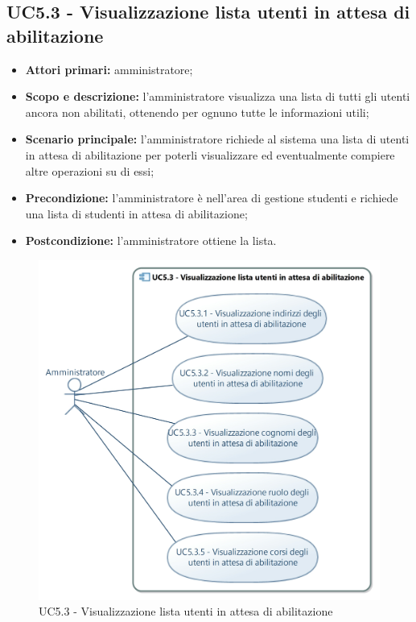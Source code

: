 \documentclass[AnalisiDeiRequisiti.tex]{subfiles}
\begin{document}
\subsection{UC5.3 - Visualizzazione lista utenti in attesa di abilitazione}
\begin{itemize}
	\item \textbf{Attori primari:} amministratore;
	\item \textbf{Scopo e descrizione:} l'amministratore visualizza una lista di tutti gli utenti ancora non abilitati, ottenendo per ognuno tutte le informazioni utili;
	\item \textbf{Scenario principale:} l'amministratore richiede al sistema una lista di utenti in attesa di abilitazione per poterli visualizzare ed eventualmente compiere altre operazioni su di essi;
	\item \textbf{Precondizione:} l'amministratore è nell'area di gestione studenti e richiede una lista di studenti in attesa di abilitazione; 
	\item \textbf{Postcondizione:} l'amministratore ottiene la lista.
\end{itemize}
\begin{figure}[H]
	\centering
	\includegraphics[width=0.9\linewidth]{UC5_3.jpg}
	\caption{UC5.3 - Visualizzazione lista utenti in attesa di abilitazione}
	\label{fig:UC5.3 - Visualizzazione lista utenti in attesa di abilitazione}
\end{figure}
\end{document}
